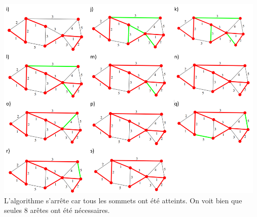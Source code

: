 \begin{Exercice}[10 minutes]
\begin{solution}
        \includegraphics[width=13cm]{solutions/K2.PNG}\\
        L'algorithme s'arrête car tous les sommets ont été atteints. On voit bien que seules 8 arêtes ont été nécessaires.
      
    \end{solution}

\end{Exercice}


